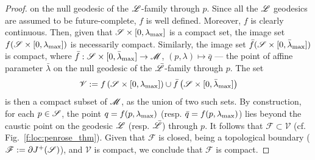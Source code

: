 \begin{proof}
on the null geodesic of the $\mathscr{L}$-family through $p$.
Since all the $\mathscr{L}$ geodesics are assumed to be future-complete, $f$ is well defined.
Moreover, $f$ is clearly continuous. Then, given that
$\mathscr{S} \times [0,\lambda_{\rm max}]$ is a compact set, the image set
$f(\mathscr{S} \times [0,\lambda_{\rm max}])$ is necessarily compact. Similarly, the image set
$\bar{f}(\mathscr{S} \times [0,\bar\lambda_{\rm max}])$ is compact, where
$\bar{f}: \mathscr{S} \times [0,\bar\lambda_{\rm max}] \to \mathscr{M}$, $(p,\lambda) \mapsto \bar{q}$ --- the point of affine parameter $\bar\lambda$
on the null geodesic of the $\bar{\mathscr{L}}$-family through $p$.
The set
\[
    \mathscr{V} := f\left(\mathscr{S} \times [0,\lambda_{\rm max}]\right)
        \cup \bar{f}\left(\mathscr{S} \times [0,\bar\lambda_{\rm max}]\right)
\]
is then a compact subset of $\mathscr{M}$, as the union of two such sets. By construction, for each $p\in\mathscr{S}$, the
point $q = f(p,\lambda_{\rm max})$ (resp. $\bar{q} = f(p,\lambda_{\rm max})$)
lies beyond the caustic point on the geodesic $\mathscr{L}$ (resp. $\bar{\mathscr{L}}$)
through $p$. It follows that $\mathscr{F} \subset \mathscr{V}$ (cf. Fig.~\ref{f:loc:penrose_thm}).
Given that $\mathscr{F}$
is closed, being a topological boundary ($\mathscr{F} := \partial J^+(\mathscr{S})$),
and $\mathscr{V}$ is compact, we conclude that $\mathscr{F}$ is compact.


\end{proof}
